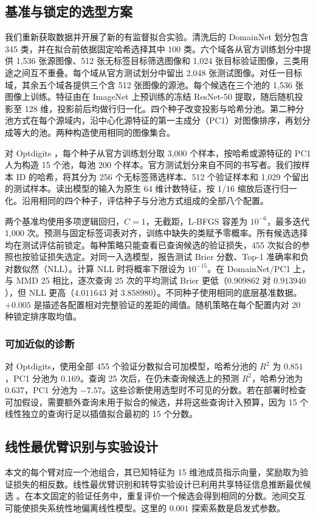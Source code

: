 \documentclass[UTF8,fontset=fandol,scheme=chinese,zihao=false,11pt,letterpaper]{ctexart}
\begin{document}
\subsection{基准与锁定的选型方案}
\label{app:fresh-protocol}
我们重新获取数据并开展了新的有监督拟合实验。清洗后的 DomainNet 划分包含 345 类，并在拟合前依据固定哈希选择其中 100 类。六个域各从官方训练划分中提供 1,536 张源图像、512 张无标签目标筛选图像和 1,024 张目标验证图像，三类用途之间互不重叠。每个域从官方测试划分中留出 2,048 张测试图像。对任一目标域，其余五个域各提供三个含 512 张图像的源池。每个候选在三个池的 1,536 张图像上训练。特征由在 ImageNet 上预训练的冻结 ResNet-50 提取，随后随机投影至 128 维，投影前后均做行归一化。四个种子改变投影与哈希分池。第二种分池方式在每个源域内，沿中心化源特征的第一主成分（PC1）对图像排序，再划分成等大的池。两种构造使用相同的图像集合。

对 Optdigits \citep{alpaydin1998optdigits}，每个种子从官方训练划分取 3,000 个样本，按哈希或源特征的 PC1 人为构造 15 个池，每池 200 个样本。官方测试划分来自不同的书写者。我们按样本 ID 的哈希，将其分为 256 个无标签筛选样本、512 个验证样本和 1,029 个留出的测试样本。读出模型的输入为原生 64 维计数特征，按 $1/16$ 缩放后逐行归一化。沿用相同的四个种子，评估种子与分池方式组成的全部八个配置。

两个基准均使用多项逻辑回归，$C=1$，无截距，L-BFGS 容差为 $10^{-6}$，最多迭代 1,000 次。预测与固定标签词表对齐，训练中缺失的类赋予零概率。所有候选选择均在测试评估前锁定。每种策略只能查看已查询候选的验证损失，455 次拟合的参照也按验证损失选定。对同一入选模型，报告测试 Brier 分数、Top-1 准确率和负对数似然（NLL）。计算 NLL 时将概率下限设为 $10^{-15}$。在 DomainNet/PC1 上，与 MMD 25 相比，逐次查询 25 次的平均测试 Brier 更低（$0.909862$ 对 $0.913940$），但 NLL 更高（$4.011643$ 对 $3.858980$）。不同种子使用相同的底层基准数据。$+0.005$ 是描述各配置相对完整验证的差距的阈值。随机策略在每个配置内对 20 种锁定排序取均值。

\subsubsection{可加近似的诊断}
对 Optdigits，使用全部 455 个验证分数拟合可加模型，哈希分池的 $R^2$ 为 $0.851$，PC1 分池为 $0.169$。查询 25 次后，在仍未查询候选上的预测 $R^2$，哈希分池为 $0.637$，PC1 分池为 $-7.57$。这些诊断使用选型时不可见的分数。若在部署时检查可加假设，需要额外查询未用于拟合的候选，并将这些查询计入预算，因为 15 个线性独立的查询行足以插值拟合最初的 15 个分数。

\subsection{线性最优臂识别与实验设计}
\label{app:fresh-linear}
本文的每个臂对应一个池组合，其已知特征为 15 维池成员指示向量，奖励取为验证损失的相反数。线性最优臂识别和转导实验设计已利用共享特征信息推断最优候选 \citep{soare2014linbai,fiez2019transductive}。在本文固定的验证任务中，重复评价一个候选会得到相同的分数。池间交互可能使损失系统性地偏离线性模型。这里的 $0.001$ 探索系数是启发式参数。
\end{document}
